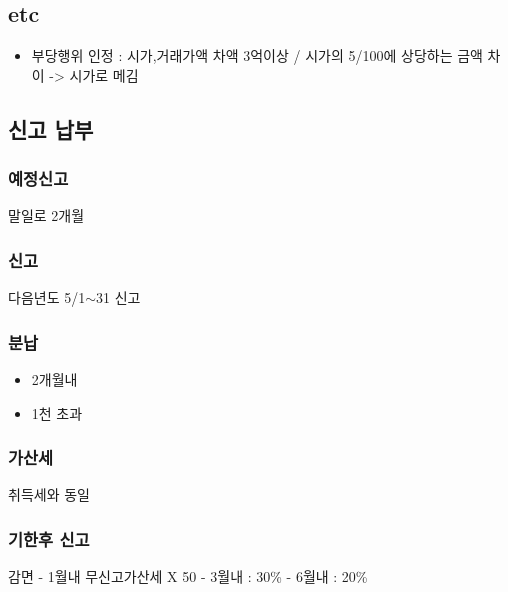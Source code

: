 \documentclass{oblivoir}
\begin{document}
\begin{multicols}{2}
\subsection{etc}\label{etc}

\begin{itemize}
\itemsep1pt\parskip0pt
\item
  부당행위 인정 : 시가,거래가액 차액 3억이상 / 시가의 5/100에 상당하는
  금액 차이 -\textgreater{} 시가로 메김
\end{itemize}

\subsection{신고 납부}\label{uxc2e0uxace0-uxb0a9uxbd80}

\subsubsection{예정신고}\label{uxc608uxc815uxc2e0uxace0}

말일로 2개월

\subsubsection{신고}\label{uxc2e0uxace0}

다음년도 5/1$\sim$31 신고

\subsubsection{분납}\label{uxbd84uxb0a9-1}

\begin{itemize}
\itemsep1pt\parskip0pt
\item
  2개월내
\item
  1천 초과
\end{itemize}

\subsubsection{가산세}\label{uxac00uxc0b0uxc138-1}

취득세와 동일

\subsubsection{기한후 신고}\label{uxae30uxd55cuxd6c4-uxc2e0uxace0}

감면 - 1월내 무신고가산세 X 50 - 3월내 : 30\% - 6월내 : 20\%


\end{multicols}
\end{document}
